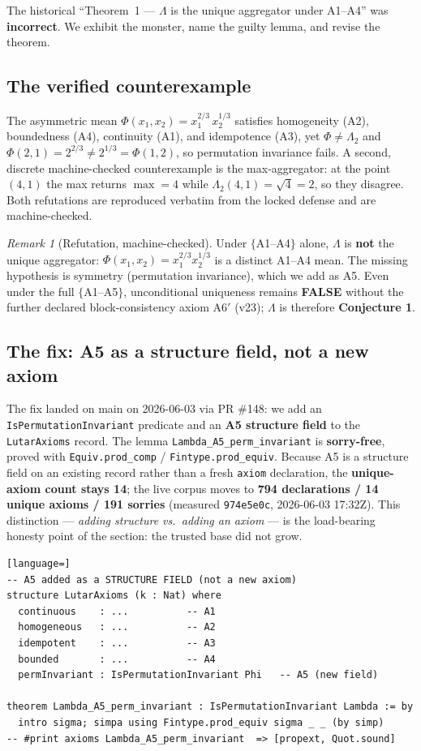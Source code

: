 \documentclass[11pt]{article}
\theoremstyle{plain}
\theoremstyle{definition}
\theoremstyle{remark}
\newtheorem{remark}[theorem]{Remark}
\newcommand{\La}{\Lambda}
\begin{document}
The historical ``Theorem~1 --- $\La$ is the unique aggregator under A1--A4'' was
\textbf{incorrect}. We exhibit the monster, name the guilty lemma, and revise the
theorem.

\subsection{The verified counterexample}
The asymmetric mean $\Phi(x_1,x_2)=x_1^{2/3}\,x_2^{1/3}$ satisfies homogeneity (A2),
boundedness (A4), continuity (A1), and idempotence (A3), yet $\Phi\neq\La_2$ and
$\Phi(2,1)=2^{2/3}\neq 2^{1/3}=\Phi(1,2)$, so permutation invariance fails. A
second, discrete machine-checked counterexample is the max-aggregator: at the point
$(4,1)$ the max returns $\max=4$ while $\La_2(4,1)=\sqrt{4}=2$, so they disagree.
Both refutations are reproduced verbatim from the locked defense and are
machine-checked.

\begin{remark}[Refutation, machine-checked]
Under $\{$A1--A4$\}$ alone, $\La$ is \textbf{not} the unique aggregator:
$\Phi(x_1,x_2)=x_1^{2/3}x_2^{1/3}$ is a distinct A1--A4 mean. The missing hypothesis
is symmetry (permutation invariance), which we add as A5. Even under the full
$\{$A1--A5$\}$, unconditional uniqueness remains \textbf{FALSE} without the further
declared block-consistency axiom A6$'$ (v23); $\La$ is therefore \textbf{Conjecture
1}.
\end{remark}

\subsection{The fix: A5 as a structure field, not a new axiom}
The fix landed on main on 2026-06-03 via PR \#148: we add an
\texttt{IsPermutationInvariant} predicate and an \textbf{A5 structure field} to the
\texttt{LutarAxioms} record. The lemma \texttt{Lambda\_A5\_perm\_invariant} is
\textbf{sorry-free}, proved with \texttt{Equiv.prod\_comp} /
\texttt{Fintype.prod\_equiv}. Because A5 is a structure field on an existing record
rather than a fresh \texttt{axiom} declaration, the \textbf{unique-axiom count stays
14}; the live corpus moves to \textbf{794 declarations / 14 unique axioms / 191
sorries} (measured \texttt{974e5e0c}, 2026-06-03 17:32Z). This distinction ---
\emph{adding structure vs.\ adding an axiom} --- is the load-bearing honesty point of
the section: the trusted base did not grow.

\begin{lstlisting}[language=]
-- A5 added as a STRUCTURE FIELD (not a new axiom)
structure LutarAxioms (k : Nat) where
  continuous    : ...          -- A1
  homogeneous   : ...          -- A2
  idempotent    : ...          -- A3
  bounded       : ...          -- A4
  permInvariant : IsPermutationInvariant Phi   -- A5 (new field)

theorem Lambda_A5_perm_invariant : IsPermutationInvariant Lambda := by
  intro sigma; simpa using Fintype.prod_equiv sigma _ _ (by simp)
-- #print axioms Lambda_A5_perm_invariant  => [propext, Quot.sound]
\end{lstlisting}
\end{document}
